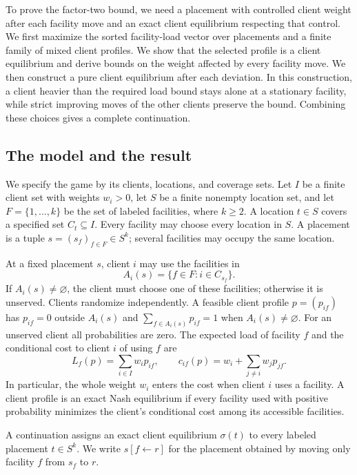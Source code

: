 \documentclass[11pt]{amsart}
\theoremstyle{definition}
\newcommand{\set}[1]{\{#1\}}
\begin{document}
To prove the factor-two bound, we need a placement with controlled client weight after each facility move and an exact client equilibrium respecting that control. We first maximize the sorted facility-load vector over placements and a finite family of mixed client profiles. We show that the selected profile is a client equilibrium and derive bounds on the weight affected by every facility move. We then construct a pure client equilibrium after each deviation. In this construction, a client heavier than the required load bound stays alone at a stationary facility, while strict improving moves of the other clients preserve the bound. Combining these choices gives a complete continuation.

\subsection{The model and the result}\label{subsec:model}
We specify the game by its clients, locations, and coverage sets. Let $I$ be a finite client set with weights $w_i>0$, let $S$ be a finite nonempty location set, and let $F=\set{1,\ldots,k}$ be the set of labeled facilities, where $k\ge2$. A location $t\in S$ covers a specified set $C_t\subseteq I$. Every facility may choose every location in $S$. A placement is a tuple $s=(s_f)_{f\in F}\in S^k$; several facilities may occupy the same location.

At a fixed placement $s$, client $i$ may use the facilities in
\[
 A_i(s)=\set{f\in F:i\in C_{s_f}}.
\]
If $A_i(s)\ne\varnothing$, the client must choose one of these facilities; otherwise it is unserved. Clients randomize independently. A feasible client profile $p=(p_{if})$ has $p_{if}=0$ outside $A_i(s)$ and $\sum_{f\in A_i(s)}p_{if}=1$ when $A_i(s)\ne\varnothing$. For an unserved client all probabilities are zero. The expected load of facility $f$ and the conditional cost to client $i$ of using $f$ are
\begin{equation}\label{eq:cost}
 L_f(p)=\sum_{i\in I}w_ip_{if},
 \qquad c_{if}(p)=w_i+\sum_{j\ne i}w_jp_{jf}.
\end{equation}
In particular, the whole weight $w_i$ enters the cost when client $i$ uses a facility. A client profile is an exact Nash equilibrium if every facility used with positive probability minimizes the client's conditional cost among its accessible facilities.

A continuation assigns an exact client equilibrium $\sigma(t)$ to every labeled placement $t\in S^k$. We write $s[f\leftarrow r]$ for the placement obtained by moving only facility $f$ from $s_f$ to $r$.
\end{document}
